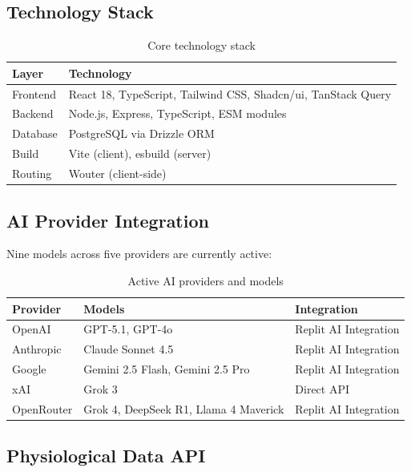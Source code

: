 \documentclass[11pt,a4paper]{article}
\begin{document}
\subsection{Technology Stack}

\begin{table}[h]
\centering
\begin{tabular}{@{}ll@{}}
\toprule
\textbf{Layer} & \textbf{Technology} \\
\midrule
Frontend & React 18, TypeScript, Tailwind CSS, Shadcn/ui, TanStack Query \\
Backend & Node.js, Express, TypeScript, ESM modules \\
Database & PostgreSQL via Drizzle ORM \\
Build & Vite (client), esbuild (server) \\
Routing & Wouter (client-side) \\
\bottomrule
\end{tabular}
\caption{Core technology stack}
\end{table}

\subsection{AI Provider Integration}

Nine models across five providers are currently active:

\begin{table}[h]
\centering
\begin{tabular}{@{}lll@{}}
\toprule
\textbf{Provider} & \textbf{Models} & \textbf{Integration} \\
\midrule
OpenAI & GPT-5.1, GPT-4o & Replit AI Integration \\
Anthropic & Claude Sonnet 4.5 & Replit AI Integration \\
Google & Gemini 2.5 Flash, Gemini 2.5 Pro & Replit AI Integration \\
xAI & Grok 3 & Direct API \\
OpenRouter & Grok 4, DeepSeek R1, Llama 4 Maverick & Replit AI Integration \\
\bottomrule
\end{tabular}
\caption{Active AI providers and models}
\end{table}

\subsection{Physiological Data API}
\end{document}
